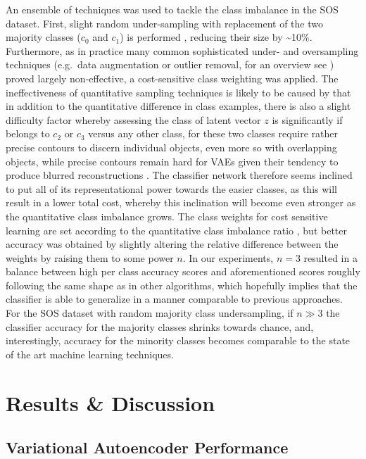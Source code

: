 \documentclass[twocolumn]{article}
\begin{document}
\noindent An ensemble of techniques was used to tackle the class imbalance in the
SOS dataset. First, slight random under-sampling with replacement of the
two majority classes (\(c_0\) and \(c_1\)) is performed
\citep[see][]{JMLR:v18:16-365}, reducing their size by
\textasciitilde{}10\%. Furthermore, as in practice many common
sophisticated under- and oversampling techniques (e.g.~data augmentation
or outlier removal, for an overview see \citet{fernandez2013}) proved
largely non-effective, a cost-sensitive class weighting was applied. The
ineffectiveness of quantitative sampling techniques is likely to be caused
by that in addition to the quantitative difference in class examples,
there is also a slight difficulty factor whereby assessing the class of
latent vector \(z\) is significantly if belongs to \(c_2\) or \(c_3\)
versus any other class, for these two classes require rather precise
contours to discern individual objects, even more so with overlapping
objects, while precise contours remain hard for VAEs given their
tendency to produce blurred reconstructions
\citep{larsen2015autoencoding}. The classifier network therefore seems
inclined to put all of its representational power towards the easier
classes, as this will result in a lower total cost, whereby this
inclination will become even stronger as the quantitative class
imbalance grows. The class weights for cost sensitive learning are set
according to the quantitative class imbalance ratio \citep[similar to
section 3.2 in][]{fernandez2013}, but better accuracy was obtained by
slightly altering the relative difference between the weights by raising
them to some power \(n\). In our experiments, \(n=3\) resulted in a
balance between high per class accuracy scores and aforementioned scores
roughly following the same shape as in other algorithms, which hopefully
implies that the classifier is able to generalize in a manner comparable
to previous approaches. For the SOS dataset with random majority class
undersampling, if \(n \gg 3\) the classifier accuracy for the majority
classes shrinks towards chance, and, interestingly, accuracy for the
minority classes becomes comparable to the state of the art machine
learning techniques.


\hypertarget{results-discussion}{%
\section{Results \& Discussion}\label{results-discussion}}

\hypertarget{variational-autoencoder-performance}{%
\subsection{Variational Autoencoder
Performance}\label{variational-autoencoder-performance}}
\end{document}
